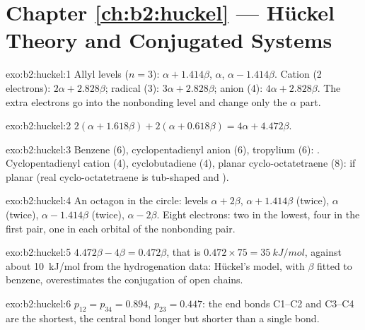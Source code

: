 \section*{Chapter \ref{ch:b2:huckel} --- Hückel Theory and Conjugated Systems}

\begin{solution}{exo:b2:huckel:1}
Allyl levels ($n = 3$): $\alpha + 1.414\beta$, $\alpha$, $\alpha - 1.414\beta$. Cation (2 electrons):
$2\alpha + 2.828\beta$; radical (3): $3\alpha + 2.828\beta$; anion (4): $4\alpha + 2.828\beta$. The extra
electrons go into the nonbonding level and change only the $\alpha$ part.
\end{solution}

\begin{solution}{exo:b2:huckel:2}
$2(\alpha + 1.618\beta) + 2(\alpha + 0.618\beta) = 4\alpha + 4.472\beta$.
\end{solution}

\begin{solution}{exo:b2:huckel:3}
Benzene (6), cyclopentadienyl anion (6), tropylium (6): . Cyclopentadienyl
cation (4), cyclobutadiene (4), planar cyclo-octatetraene (8):  if planar
(real cyclo-octatetraene is tub-shaped and ).
\end{solution}

\begin{solution}{exo:b2:huckel:4}
An octagon in the circle: levels $\alpha + 2\beta$, $\alpha + 1.414\beta$ (twice), $\alpha$ (twice),
$\alpha - 1.414\beta$ (twice), $\alpha - 2\beta$. Eight electrons: two in the lowest, four in the
first pair, one in each orbital of the nonbonding pair.
\end{solution}

\begin{solution}{exo:b2:huckel:5}
$4.472\beta - 4\beta = 0.472\beta$, that is $0.472 \times 75 = \qty{35}{kJ/mol}$, against about
\qty{10}{kJ/mol} from the hydrogenation data: Hückel's model, with $\beta$ fitted to benzene,
overestimates the conjugation of open chains.
\end{solution}

\begin{solution}{exo:b2:huckel:6}
$p_{12} = p_{34} = 0.894$, $p_{23} = 0.447$: the end bonds C1--C2 and C3--C4 are the
shortest, the central bond longer but shorter than a single bond.
\end{solution}

